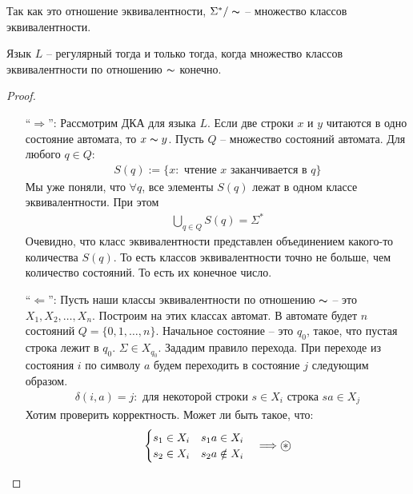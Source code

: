 Так как это отношение эквивалентности, $\Sigma^* / \thicksim$ -- множество классов эквивалентности. 

\begin{theorem}
    Язык $L$ -- регулярный тогда и только тогда, когда множество классов эквивалентности по отношению $\thicksim$ конечно.
\end{theorem}
\begin{proof} \quad

    \begin{enumerate}
        \item[``$\Longrightarrow$'':] Рассмотрим ДКА для языка $L$. Если две строки $x$ и $y$ читаются в одно состояние автомата, то $x \thicksim y$. Пусть $Q$ -- множество состояний автомата. Для любого $q \in Q$:
        \begin{gather*}
            S(q) := \{x : \text{ чтение $x$ заканчивается в $q$} \}
        \end{gather*}
        Мы уже поняли, что $\forall q$, все элементы $S(q)$ лежат в одном классе эквивалентности. При этом 
        \begin{gather*}
            \bigcup\limits_{q \in Q} S(q) = \Sigma^*
        \end{gather*}
        Очевидно, что класс эквивалентности представлен объединением какого-то количества $S(q)$. То есть классов эквивалентности точно не больше, чем количество состояний. То есть их конечное число.
        \item[``$\Longleftarrow$'':] Пусть наши классы эквивалентности по отношению $\thicksim$ -- это $X_1, X_2, \dots, X_n$. Построим на этих классах автомат. В автомате будет $n$ состояний $Q = \{0, 1, \dots, n\}$. Начальное состояние -- это $q_0$, такое, что пустая строка лежит в $q_0$. $\Sigma \in X_{q_0}$. Зададим правило перехода. При переходе из состояния $i$ по символу $a$ будем переходить в состояние $j$ следующим образом. 
        \begin{gather*}
            \delta(i, a) = j : \text{ для некоторой строки } s \in X_i \text{ строка } sa \in X_j
        \end{gather*}
        Хотим проверить корректность. Может ли быть такое, что: 
        \begin{gather*}
            \begin{cases}
                s_1 \in X_i \quad s_1 a \in X_i \\
                s_2 \in X_i \quad s_2 a \notin X_i
            \end{cases} \Longrightarrow \oast
        \end{gather*}

\end{enumerate}
\end{proof}
